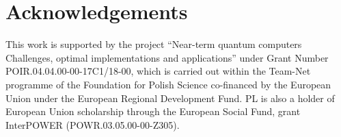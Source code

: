 \documentclass[preprint,12pt, a4paper, dvipsnames]{elsarticle}
\newcommand{\1}{{\rm 1\hspace{-0.9mm}l}}
\theoremstyle{definition}
\begin{document}
\section*{Acknowledgements}

This work is  supported by
the project “Near-term quantum computers Challenges, optimal implementations and applications” under Grant Number POIR.04.04.00-00-17C1/18-00, which is carried out within the Team-Net programme of the Foundation for Polish Science co-financed by the European Union under the European Regional Development Fund.
PL is also a holder of European Union scholarship through the European Social Fund,
grant InterPOWER (POWR.03.05.00-00-Z305).


\end{document}
